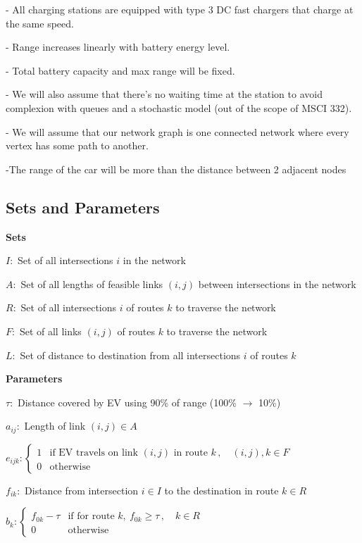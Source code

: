 \documentclass[12pt, fleqn]{article}
\begin{document}
- All charging stations are equipped with type 3 DC fast chargers that charge at the same speed.

- Range increases linearly with battery energy level.

- Total battery capacity and max range will be fixed.

- We will also assume that there's no waiting time at the station to avoid complexion with queues and a stochastic model (out of the scope of MSCI 332).

- We will assume that our network graph is one connected network where every vertex has some path to another.

-The range of the car will be more than the distance between 2 adjacent nodes


\subsection{Sets and Parameters}

\textbf{Sets}

$I:$ Set of all intersections $i$ in the network

$A:$ Set of all lengths of feasible links $(i,j)$ between intersections in the network

$R:$ Set of all intersections $i$ of routes $k$ to traverse the network

$F:$ Set of all links $(i,j)$ of routes $k$ to traverse the network

$L:$ Set of distance to destination from all intersections $i$ of routes $k$

\textbf{Parameters}

$\tau:$ Distance covered by EV using 90\% of range (100\% $\rightarrow$ 10\%)

$a_{ij}:$ Length of link $(i,j) \in A$

$e_{ijk}: \begin{cases}
        1 & \text{if EV travels on link } (i,j) \text{ in route } k \,, \quad (i,j), k \in F \\
        0 & \text{otherwise}
    \end{cases}$

$f_{ik}:$ Distance from intersection $i \in I$ to the destination in route $k \in R$

$b_{k}: \begin{cases}
        f_{0k}-\tau & \text{if for route } k,\ f_{0k} \geq \tau \,, \quad k \in R \\
        0           & \text{otherwise}
    \end{cases}$
\end{document}
